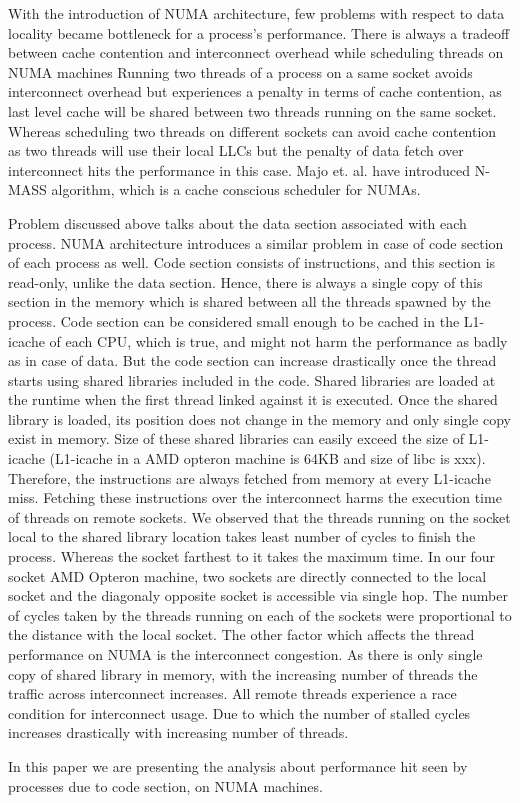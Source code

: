 With the introduction of NUMA architecture, few problems with respect to data locality became bottleneck for a process's performance.
There is always a tradeoff between cache contention and interconnect overhead while scheduling threads on NUMA machines \cite{Majo:2011:MMN:1993478.1993481}
Running two threads of a process on a same socket avoids interconnect overhead but experiences a penalty in terms of cache contention, as last level cache will be shared between two threads running on the same socket.
Whereas scheduling two threads on different sockets can avoid cache contention as two threads will use their local LLCs but the penalty of data fetch over interconnect hits the performance in this case.
Majo et. al. \cite{Majo:2011:MMN:1993478.1993481} have introduced N-MASS algorithm, which is a cache conscious scheduler for NUMAs.


Problem discussed above talks about the data section associated with each process.
NUMA architecture introduces a similar problem in case of code section of each process as well.
Code section consists of instructions, and this section is read-only, unlike the data section.
Hence, there is always a single copy of this section in the memory which is shared between all the threads spawned by the process.
Code section can be considered small enough to be cached in the L1-icache of each CPU, which is true, and might not harm the performance as badly as in case of data.
But the code section can increase drastically once the thread starts using shared libraries included in the code.
Shared libraries are loaded at the runtime when the first thread linked against it is executed.
Once the shared library is loaded, its position does not change in the memory and only single copy exist in memory.
Size of these shared libraries can easily exceed the size of L1-icache (L1-icache in a AMD opteron machine is 64KB and size of libc is xxx).
Therefore, the instructions are always fetched from memory at every L1-icache miss.
Fetching these instructions over the interconnect harms the execution time of threads on remote sockets.
We observed that the threads running on the socket local to the shared library location takes least number of cycles to finish the process.
Whereas the socket farthest to it takes the maximum time.
In our four socket AMD Opteron machine, two sockets are directly connected to the local socket and the diagonaly opposite socket is accessible via single hop.
The number of cycles taken by the threads running on each of the sockets were proportional to the distance with the local socket.
The other factor which affects the thread performance on NUMA is the interconnect congestion.
As there is only single copy of shared library in memory, with the increasing number of threads the traffic across interconnect increases.
All remote threads experience a race condition for interconnect usage.
Due to which the number of stalled cycles increases drastically with increasing number of threads.


In this paper we are presenting the analysis about performance hit seen by processes due to code section, on NUMA machines.

